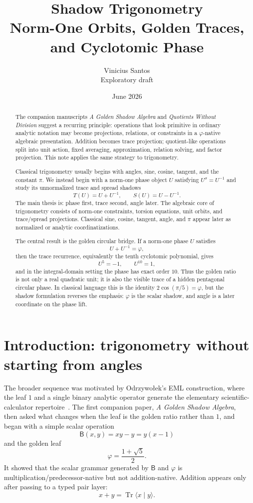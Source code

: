 \documentclass[11pt]{article}
\title{Shadow Trigonometry\\
\large Norm-One Orbits, Golden Traces, and Cyclotomic Phase}
\author{Vinicius Santos\\
\small Exploratory draft}
\date{June 2026}
\newcommand{\B}{\mathsf{B}}
\newcommand{\Tr}{\operatorname{Tr}}
\newcommand{\ph}{\varphi}
\newcommand{\sig}{\sigma}
\begin{document}
\maketitle

\begin{abstract}
The companion manuscripts \emph{A Golden Shadow Algebra} and \emph{Quotients Without Division} suggest a recurring principle: operations that look primitive in ordinary analytic notation may become projections, relations, or constraints in a $\ph$-native algebraic presentation.  Addition becomes trace projection; quotient-like operations split into unit action, fixed averaging, approximation, relation solving, and factor projection.  This note applies the same strategy to trigonometry.

Classical trigonometry usually begins with angles, sine, cosine, tangent, and the constant $\pi$.  We instead begin with a norm-one phase object $U$ satisfying $U^\sig=U^{-1}$ and study its unnormalized trace and spread shadows
\[
    T(U)=U+U^{-1},
    \qquad
    S(U)=U-U^{-1}.
\]
The main thesis is: phase first, trace second, angle later.  The algebraic core of trigonometry consists of norm-one constraints, torsion equations, unit orbits, and trace/spread projections.  Classical sine, cosine, tangent, angle, and $\pi$ appear later as normalized or analytic coordinatizations.

The central result is the golden circular bridge.  If a norm-one phase $U$ satisfies
\[
    U+U^{-1}=\ph,
\]
then the trace recurrence, equivalently the tenth cyclotomic polynomial, gives
\[
    U^5=-1,
    \qquad
    U^{10}=1,
\]
and in the integral-domain setting the phase has exact order $10$.  Thus the golden ratio is not only a real quadratic unit; it is also the visible trace of a hidden pentagonal circular phase.  In classical language this is the identity $2\cos(\pi/5)=\ph$, but the shadow formulation reverses the emphasis: $\ph$ is the scalar shadow, and angle is a later coordinate on the phase lift.
\end{abstract}

\tableofcontents

\section{Introduction: trigonometry without starting from angles}

The broader sequence was motivated by Odrzywo\l{}ek's EML construction, where the leaf $1$ and a single binary analytic operator generate the elementary scientific-calculator repertoire~\cite{Odrzywolek2026EML}.  The first companion paper, \emph{A Golden Shadow Algebra}, then asked what changes when the leaf is the golden ratio rather than $1$, and began with a simple scalar operation
\[
    \B(x,y)=xy-y=y(x-1)
\]
and the golden leaf
\[
    \ph=\frac{1+\sqrt5}{2}.
\]
It showed that the scalar grammar generated by $\B$ and $\ph$ is multiplication/predecessor-native but not addition-native.  Addition appears only after passing to a typed pair layer:
\[
    x+y=\Tr\langle x\mid y\rangle.
\]
\end{document}
